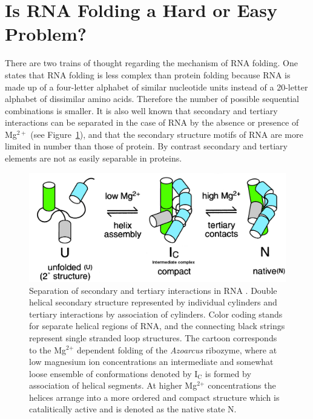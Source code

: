\section{Is RNA Folding a Hard or Easy Problem?}
There  are  two trains  of  thought  regarding  the mechanism  of  RNA
folding.  One  states that  RNA folding is  less complex  than protein
folding  \cite{tinoco1999} because  RNA is  made up  of a  four-letter
alphabet of similar  nucleotide units instead of a  20-letter alphabet
of  dissimilar   amino  acids.   Therefore  the   number  of  possible
sequential  combinations  is smaller.   It  is  also  well known  that
secondary and  tertiary interactions can  be separated in the  case of
RNA  by the absence  or presence  of Mg$^{2+}$  \cite{rangan2003} (see
Figure~\ref{fig:folding}), and  that the secondary structure motifs
of RNA are more limited  in  number  than  those  of protein. By contrast
secondary  and tertiary elements are not as easily separable in
proteins.
\begin{figure}[ht]
\centering
\includegraphics[scale=0.3]{Chapter1/rangan2003pnas.png}
\caption{Separation  of  secondary and  tertiary  interactions in  RNA
  \cite{rangan2003}. Double helical secondary structure represented by
  individual  cylinders and  tertiary interactions  by  association of
  cylinders. Color coding stands  for separate helical regions of RNA,
  and  the connecting  black  strings represent  single stranded  loop
  structures.   The   cartoon  corresponds  to   the  Mg$^{\text{2+}}$
  dependent folding  of the  \textit{Azoarcus} ribozyme, where  at low
  magnesium  ion  concentrations an  intermediate  and somewhat  loose
  ensemble  of conformations  denoted by  I$_{\text{C}}$ is  formed by
  association  of   helical  segments.   At   higher  Mg$^{\text{2+}}$
  concentrations the  helices arrange into a more  ordered and compact
  structure which is catalitically active and is denoted as the native
  state N.}
\label{fig:folding}
\end{figure}

